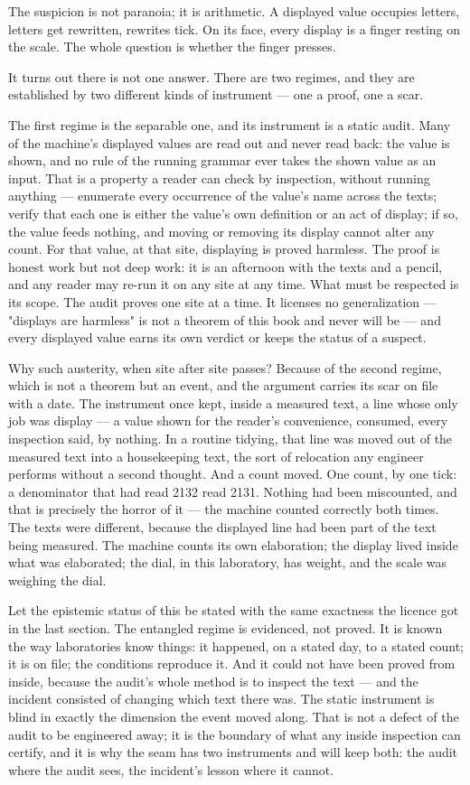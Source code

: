 The suspicion is not paranoia; it is arithmetic. A displayed value occupies letters,
letters get rewritten, rewrites tick. On its face, every display is a finger resting on
the scale. The whole question is whether the finger presses.

It turns out there is not one answer. There are two regimes, and they are established
by two different kinds of instrument --- one a proof, one a scar.

The first regime is the separable one, and its instrument is a static audit. Many of
the machine's displayed values are read out and never read back: the value is shown,
and no rule of the running grammar ever takes the shown value as an input. That is a
property a reader can check by inspection, without running anything --- enumerate every
occurrence of the value's name across the texts; verify that each one is either the
value's own definition or an act of display; if so, the value feeds nothing, and
moving or removing its display cannot alter any count. For that value, at that site,
displaying is proved harmless. The proof is honest work but not deep work: it is an
afternoon with the texts and a pencil, and any reader may re-run it on any site at any
time. What must be respected is its scope. The audit proves one site at a time. It
licenses no generalization --- "displays are harmless" is not a theorem of this book
and never will be --- and every displayed value earns its own verdict or keeps the
status of a suspect.

Why such austerity, when site after site passes? Because of the second regime, which
is not a theorem but an event, and the argument carries its scar on file with a date.
The instrument once kept, inside a measured text, a line whose only job was display ---
a value shown for the reader's convenience, consumed, every inspection said, by
nothing. In a routine tidying, that line was moved out of the measured text into a
housekeeping text, the sort of relocation any engineer performs without a second
thought. And a count moved. One count, by one tick: a denominator that had read 2132
read 2131. Nothing had been miscounted, and that is precisely the horror of it --- the
machine counted correctly both times. The texts were different, because the displayed
line had been part of the text being measured. The machine counts its own elaboration;
the display lived inside what was elaborated; the dial, in this laboratory, has weight,
and the scale was weighing the dial.

Let the epistemic status of this be stated with the same exactness the licence got in
the last section. The entangled regime is evidenced, not proved. It is known the way
laboratories know things: it happened, on a stated day, to a stated count; it is on
file; the conditions reproduce it. And it could not have been proved from inside,
because the audit's whole method is to inspect the text --- and the incident consisted
of changing which text there was. The static instrument is blind in exactly the
dimension the event moved along. That is not a defect of the audit to be engineered
away; it is the boundary of what any inside inspection can certify, and it is why the
seam has two instruments and will keep both: the audit where the audit sees, the
incident's lesson where it cannot.


